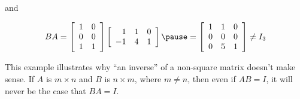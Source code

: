 \documentclass[pdf
]{beamer}
\begin{document}
{{{{\begin{example}
and
\vspace*{-.2in}

\[ BA= 
\left[\begin{array}{rr}
1 & 0 \\ 0 & 0 \\ 1 & 1 \end{array}\right]
\left[\begin{array}{rrr}
1 & 1 & 0 \\ -1 & 4 & 1 \end{array}\right]
\pause
= \left[ \begin{array}{rrr}
1 & 1 & 0 \\
0 & 0 & 0 \\
0 & 5 & 1
\end{array} \right] \neq I_3 \]
\end{example}
\pause
\begin{alertblock}{}
This example illustrates why ``an inverse'' of a non-square matrix
doesn't make sense.
If $A$ is $m\times n$ and $B$ is $n\times m$, where $m\neq n$,
then even if $AB=I$, it will never be the case that $BA=I$.
\end{alertblock}
}}

}}
\end{document}
